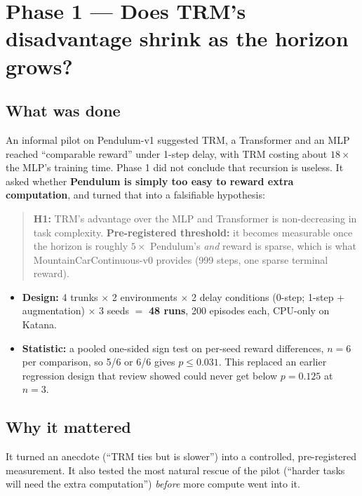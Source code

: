 \documentclass[11pt]{article}
\begin{document}
\section{Phase 1 --- Does TRM's disadvantage shrink as the horizon grows?}

\subsection{What was done}
An informal pilot on Pendulum-v1 suggested TRM, a Transformer and an MLP reached ``comparable reward'' under 1-step delay, with TRM costing about $18\times$ the MLP's training time. Phase 1 did not conclude that recursion is useless. It asked whether \textbf{Pendulum is simply too easy to reward extra computation}, and turned that into a falsifiable hypothesis:

\begin{quote}
\textbf{H1:} TRM's advantage over the MLP and Transformer is non-decreasing in task complexity. \textbf{Pre-registered threshold:} it becomes measurable once the horizon is roughly $5\times$ Pendulum's \emph{and} reward is sparse, which is what MountainCarContinuous-v0 provides (999 steps, one sparse terminal reward).
\end{quote}

\begin{itemize}
  \item \textbf{Design:} 4 trunks $\times$ 2 environments $\times$ 2 delay conditions (0-step; 1-step + augmentation) $\times$ 3 seeds $=$ \textbf{48 runs}, 200 episodes each, CPU-only on Katana.
  \item \textbf{Statistic:} a pooled one-sided sign test on per-seed reward differences, $n=6$ per comparison, so 5/6 or 6/6 gives $p\le0.031$. This replaced an earlier regression design that review showed could never get below $p=0.125$ at $n=3$.
\end{itemize}

\subsection{Why it mattered}
It turned an anecdote (``TRM ties but is slower'') into a controlled, pre-registered measurement. It also tested the most natural rescue of the pilot (``harder tasks will need the extra computation'') \emph{before} more compute went into it.
\end{document}
